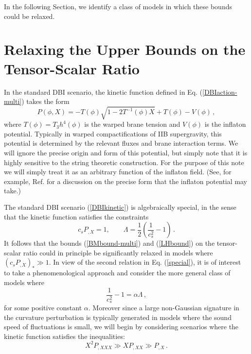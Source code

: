 In the following Section, we identify a class of models in which  
these bounds could be relaxed. 
% 
% 
\section{Relaxing the Upper Bounds on the Tensor-Scalar Ratio}
\label{sec:relaxingbound}
% 

In the standard DBI scenario, the kinetic function defined in 
Eq. (\ref{DBIaction-multi})  takes the form 
\begin{equation}
\label{DBIkinetic}
P (\phi , X) = -T(\phi ) \sqrt{1-2T^{-1}(\phi ) X} + T(\phi ) - V(\phi ) \,,
\end{equation}
where $T(\phi ) = T_3 h^4 (\phi )$ 
is the warped brane tension and  $V(\phi )$ is the 
inflaton potential. 
Typically in warped compactifications of 
IIB supergravity, this potential is determined by the 
relevant fluxes and brane interaction terms. 
We will ignore the precise origin
and form of this potential, but simply
note that it is highly sensitive to the string theoretic construction. For the
purpose of this note we will simply treat it 
as an arbitrary function of the inflaton field.
(See, for example, Ref. \cite{brane5} for a discussion 
on the precise form that the inflaton potential may take.)

The standard DBI scenario (\ref{DBIkinetic}) is algebraically special, 
in the sense that the kinetic function satisfies the constraints 
\begin{equation}
\label{special}
c_s P_{,X} = 1 , \qquad  \Lambda = \frac{1}{2} \left( 
\frac{1}{c_s^2} -1 \right) \,.
\end{equation}
It follows that the 
bounds (\ref{BMbound-multi}) and (\ref{LHbound}) 
on the tensor-scalar ratio could in principle be 
significantly relaxed in models where $(c_sP_{,X})_* \gg 1$. 
In view of the second relation in Eq. (\ref{special}), it is of interest 
to take a phenomenological approach and consider the more  
general class of models where 
\begin{equation}
\label{defalpha}
\frac{1}{c_s^2} -1 = \alpha \Lambda \,,
\end{equation}
for some positive constant $\alpha$. Moreover since 
a large non-Gaussian signature in the curvature perturbation is 
typically generated in models where the sound speed of fluctuations 
is small, we will begin by considering 
scenarios where the kinetic function satisfies the 
inequalities: 
\begin{equation}
\label{Plimits}
X^2 P_{,XXX} \gg XP_{,XX} \gg P_{,X} \,.
\end{equation}

